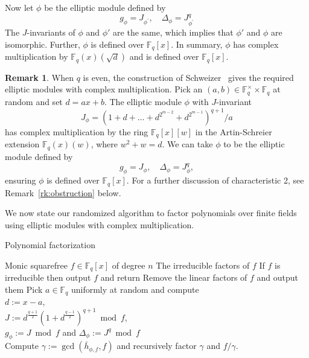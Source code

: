 \documentclass[12pt]{article}
\theoremstyle{definition}
\newtheorem{remark}{Remark}
\def\F{\ensuremath{\mathbb{F}}}
\newcommand{\D}{\Delta}
\begin{document}
Now let $\phi$ be the elliptic module defined by 
\[g_\phi = J_{\phi^\prime}, \quad  \D_\phi = J_{\phi^\prime}^{q} \]
The $J$-invariants of $\phi$ and $\phi'$ are the same, which implies that $\phi'$
and $\phi$ are isomorphic. Further, $\phi$ is defined over
$\F_q[x]$. In summary, $\phi$ has complex multiplication by
$\F_q(x)(\sqrt{d})$ and is defined over $\F_q[x]$.


\begin{remark}
When $q$ is even, the construction of Schweizer~\cite[Theorem
  6]{Schweizer97} gives the required elliptic modules with complex
multiplication. Pick an $(a,b)\in \F_q^\times \times \F_q$ at random
and set $d=ax+b$. The elliptic module $\phi$ with $J$-invariant
\[
J_{\phi} = \left(1+d+\ldots+d^{2^{m-2}}+d^{2^{m-1}}\right)^{q+1}/a
\]
has complex multiplication by the ring $\F_q[x][w]$ in the
Artin-Schreier extension $\F_q(x)(w)$, where $w^2+w=d$. We can take $\phi$ to
be the elliptic module defined by
\[g_\phi = J_{\phi}, \quad  \D_\phi = J_{\phi}^{q}, \]
ensuring $\phi$ is defined over $\F_q[x]$. For a further discussion
of characteristic 2, see Remark~\ref{rk:obstruction} below. 
\end{remark}

\noindent We now state our randomized algorithm to factor polynomials over
finite fields using elliptic modules with complex
multiplication. 

\begin{algorithm}[H]
  \caption{Polynomial factorization}
  \label{alg:factoring}
  \begin{algorithmic}[1]
    \REQUIRE Monic squarefree $f \in \F_q[x]$ of degree $n$
    \ENSURE The irreducible factors of $f$
    \STATE If $f$ is irreducible then output $f$ and return
    \STATE\label{step:fac-2}
    Remove the linear factors of $f$ and output them
    \STATE\label{step:fac-3}
    Pick $a \in \F_q$ uniformly at random and compute \\
    $d := x - a$,\\
    $J:=d^{\frac{q+1}{2}}\left(1+d^{\frac{q-1}{2}}\right)^{q+1} \bmod f$, \\
	$g_\phi:=J \bmod f$ and	$\Delta_\phi := J^q \bmod f$\\	
    \STATE\label{step:fac-split}
    Compute $\gamma := \gcd(\bar h_{\phi,f}, f)$ and recursively factor $\gamma$ and $f/\gamma$.
  \end{algorithmic}
\end{algorithm}
\end{document}
